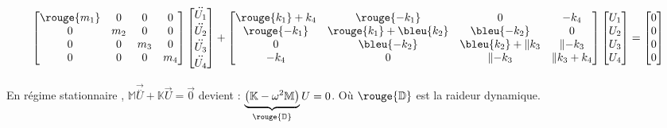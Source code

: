 \documentclass[12pt,a4paper]{article}
\begin{document}
\begin{ex}
		\[
		\left[\begin{matrix}
			\rouge{m_1} & 0 & 0 & 0 \\
			0 & m_2 & 0 & 0 \\
			0 & 0 & m_3 & 0 \\
			0 & 0 & 0 & m_4
		\end{matrix}\right]\left[\begin{matrix}
			\overset{\textbf{..}}{U_1} \\ \overset{\textbf{..}}{U_2} \\ \overset{\textbf{..}}{U_3} \\ \overset{\textbf{..}}{U_4}
		\end{matrix}\right] + \left[\begin{matrix}
			\rouge{k_1} + k_4 & \rouge{-k_1} & 0 & -k_4 \\
			\rouge{-k_1} & \rouge{k_1}+\bleu{k_2} & \bleu{-k_2} & 0 \\
			0 & \bleu{-k_2} & \bleu{k_2} + \Vert{k_3} & \Vert{-k_3} \\
			-k_4 & 0 & \Vert{-k_3} & \Vert{k_3} + k_4
		\end{matrix}\right]\left[\begin{matrix}
			U_1 \\ U_2 \\ U_3 \\ U_4
		\end{matrix}\right] = \left[\begin{matrix}
			0 \\ 0 \\ 0 \\ 0
		\end{matrix}\right]
		\]
		
		En régime stationnaire , $\mathbb{M}\overset{\rightarrow}{\overset{\textbf{..}}{U}} + \mathbb{K}\overset{\rightarrow}{U} = \overset{\rightarrow}{0}$ devient : $ \underbrace{\left(\mathbb{K}-\omega^2\mathbb{M}\right)}_{\rouge{\mathbb{D}}}U = 0$. Où $\rouge{\mathbb{D}}$ est la raideur dynamique.		
	\end{ex}
	
\end{document}
